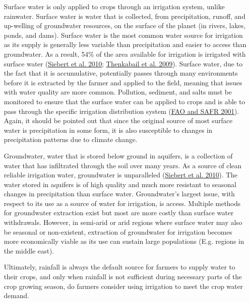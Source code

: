 \documentclass[12pt,twoside]{reedthesis}
\begin{document}
Surface water is only applied to crops through an irrigation system, unlike rainwater. Surface water is water that is collected, from precipitation, runoff, and up-welling of groundwater resources, on the surface of the planet (in rivers, lakes, ponds, and dams). Surface water is the most common water source for irrigation as its supply is generally less variable than precipitation and easier to access than groundwater. As a result, 54\% of the area available for irrigation is irrigated with surface water (\protect\hyperlink{ref-siebertGroundwaterUseIrrigation2010}{Siebert et al. 2010}; \protect\hyperlink{ref-thenkabailGlobalIrrigatedArea2009}{Thenkabail et al. 2009}). Surface water, due to the fact that it is accumulative, potentially passes through many environments before it is extracted by the farmer and applied to the field, meaning that issues with water quality are more common. Pollution, sediment, and salts must be monitored to ensure that the surface water can be applied to crops and is able to pass through the specific irrigation distribution system (\protect\hyperlink{ref-faoIrrigationManualPlanning2001}{FAO and SAFR 2001}). Again, it should be pointed out that since the original source of most surface water is precipitation in some form, it is also susceptible to changes in precipitation patterns due to climate change.

Groundwater, water that is stored below ground in aquifers, is a collection of water that has infiltrated through the soil over many years. As a source of clean reliable irrigation water, groundwater is unparalleled (\protect\hyperlink{ref-siebertGroundwaterUseIrrigation2010}{Siebert et al. 2010}). The water stored in aquifers is of high quality and much more resistant to seasonal changes in precipitation than surface water. Groundwater's largest issue, with respect to its use as a source of water for irrigation, is access. Multiple methods for groundwater extraction exist but most are more costly than surface water withdrawals. However, in semi-arid or arid regions where surface water may also be seasonal or non-existent, extraction of groundwater for irrigation becomes more economically viable as its use can sustain large populations (E.g. regions in the middle east).

Ultimately, rainfall is always the default source for farmers to supply water to their crops, and only when rainfall is not sufficient during necessary parts of the crop growing season, do farmers consider using irrigation to meet the crop water demand.
\end{document}
